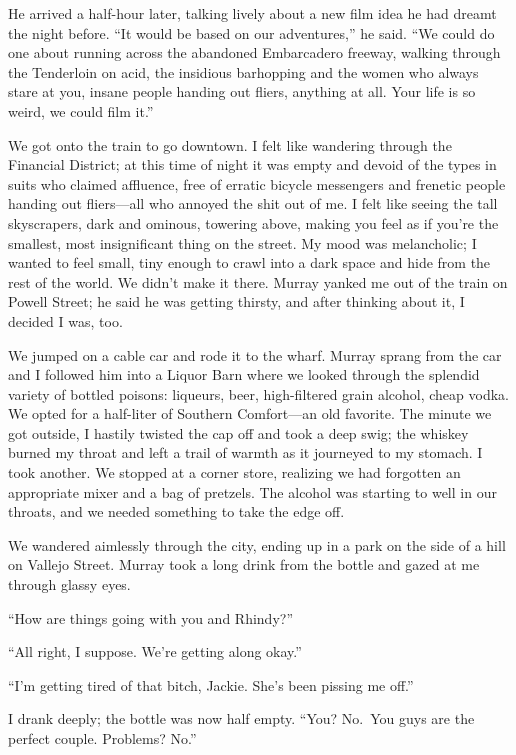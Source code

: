 He arrived a half-hour later, talking lively about a new film idea he
had dreamt the night before. ``It would be based on our adventures,'' he
said. ``We could do one about running across the abandoned Embarcadero
freeway, walking through the Tenderloin on acid, the insidious
barhopping and the women who always stare at you, insane people handing
out fliers, anything at all. Your life is so weird, we could film it.''

We got onto the train to go downtown. I felt like wandering through the
Financial District; at this time of night it was empty and devoid of the
types in suits who claimed affluence, free of erratic bicycle messengers
and frenetic people handing out fliers---all who annoyed the shit out of
me. I felt like seeing the tall skyscrapers, dark and ominous, towering
above, making you feel as if you're the smallest, most insignificant
thing on the street. My mood was melancholic; I wanted to feel small,
tiny enough to crawl into a dark space and hide from the rest of the
world. We didn't make it there. Murray yanked me out of the train on
Powell Street; he said he was getting thirsty, and after thinking about
it, I decided I was, too.

We jumped on a cable car and rode it to the wharf. Murray sprang from
the car and I followed him into a Liquor Barn where we looked through
the splendid variety of bottled poisons: liqueurs, beer, high-filtered
grain alcohol, cheap vodka. We opted for a half-liter of Southern
Comfort---an old favorite. The minute we got outside, I hastily twisted
the cap off and took a deep swig; the whiskey burned my throat and left
a trail of warmth as it journeyed to my stomach. I took another. We
stopped at a corner store, realizing we had forgotten an appropriate
mixer and a bag of pretzels. The alcohol was starting to well in our
throats, and we needed something to take the edge off.

We wandered aimlessly through the city, ending up in a park on the side
of a hill on Vallejo Street. Murray took a long drink from the bottle
and gazed at me through glassy eyes.

``How are things going with you and Rhindy?''

``All right, I suppose. We're getting along okay.''

``I'm getting tired of that bitch, Jackie. She's been pissing me off.''

I drank deeply; the bottle was now half empty. ``You? No.~You guys are
the perfect couple. Problems? No.''

